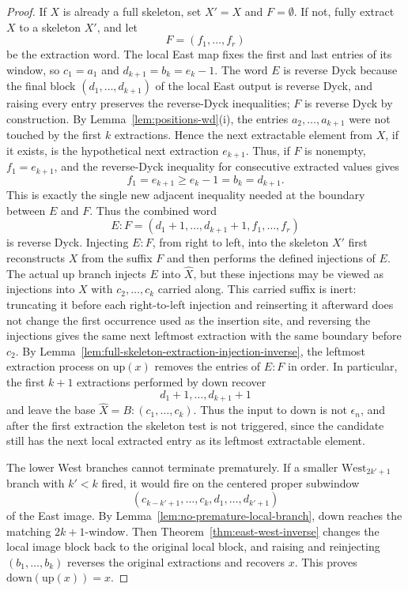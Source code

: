 \documentclass[11pt]{article}
\theoremstyle{plain}
\theoremstyle{definition}
\theoremstyle{remark}
\begin{document}
\begin{proof}
If \(X\) is already a full skeleton, set \(X'=X\) and \(F=\emptyset\).  If not,
fully extract \(X\) to a skeleton \(X'\), and let
\[
  F=(f_1,\ldots,f_r)
\]
be the extraction word.  The local East map fixes the first and last entries
of its window, so \(c_1=a_1\) and \(d_{k+1}=b_k=e_k-1\).  The word \(E\) is
reverse Dyck because the final block
\((d_1,\ldots,d_{k+1})\) of the local East output is reverse Dyck, and raising
every entry preserves the reverse-Dyck inequalities; \(F\) is reverse Dyck by
construction.  By
Lemma~\ref{lem:positions-wd}\textup{(i)}, the entries
\(a_2,\ldots,a_{k+1}\) were not touched by the first \(k\) extractions.  Hence
the next extractable element from \(X\), if it exists, is the hypothetical next
extraction \(e_{k+1}\).  Thus, if \(F\) is nonempty, \(f_1=e_{k+1}\), and the
reverse-Dyck inequality for consecutive extracted values gives
\[
  f_1=e_{k+1}\ge e_k-1=b_k=d_{k+1}.
\]
This is exactly the single new adjacent inequality needed at the boundary
between \(E\) and \(F\).  Thus the combined word
\[
  E:F=(d_1+1,\ldots,d_{k+1}+1,f_1,\ldots,f_r)
\]
is reverse Dyck.  Injecting \(E:F\), from right to left, into the skeleton
\(X'\) first reconstructs \(X\) from the suffix \(F\) and then performs the
defined injections of \(E\).  The actual \(\mathrm{up}\) branch injects \(E\)
into \(\widehat X\), but these injections may be viewed as injections into
\(X\) with \(c_2,\ldots,c_k\) carried along.  This carried suffix is inert:
truncating it before each right-to-left injection and reinserting it afterward
does not change the first occurrence used as the insertion site, and reversing
the injections gives the same next leftmost extraction with the same boundary
before \(c_2\).  By
Lemma~\ref{lem:full-skeleton-extraction-injection-inverse}, the leftmost
extraction process on \(\mathrm{up}(x)\) removes the entries of \(E:F\) in
order.  In particular, the first \(k+1\) extractions performed by
\(\mathrm{down}\) recover
\[
  d_1+1,\ldots,d_{k+1}+1
\]
and leave the base \(\widehat X=B:(c_1,\ldots,c_k)\).
Thus the input to \(\mathrm{down}\) is not \(\epsilon_n\), and after the first
extraction the skeleton test is not triggered, since the candidate still has
the next local extracted entry as its leftmost extractable element.

The lower West branches cannot terminate prematurely.  If a smaller
\(\mathrm{West}_{2k'+1}\) branch with \(k'<k\) fired, it would fire on the
centered proper subwindow
\[
  (c_{k-k'+1},\ldots,c_k,d_1,\ldots,d_{k'+1})
\]
of the East image.  By Lemma~\ref{lem:no-premature-local-branch},
\(\mathrm{down}\) reaches the matching \(2k+1\)-window.  Then
Theorem~\ref{thm:east-west-inverse} changes the local image block back to the
original local block, and raising and reinjecting
\((b_1,\ldots,b_k)\) reverses the original extractions and recovers \(x\).
This proves \(\mathrm{down}(\mathrm{up}(x))=x\).


\end{proof}
\end{document}

